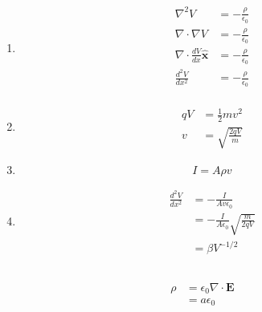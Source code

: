 \documentclass{article}
\renewcommand{\vec}[1]{\boldsymbol{\mathbf{#1}}}
\newcommand{\uvec}[1]{\hat{\vec{#1}}}
\begin{document}
\begin{enumerate}
  \item

        \begin{align*}
          \nabla^2 V                            & = -\frac{\rho}{\epsilon_0} \\
          \nabla \cdot \nabla V                 & = -\frac{\rho}{\epsilon_0} \\
          \nabla \cdot \frac{d V}{d x} \uvec{x} & = -\frac{\rho}{\epsilon_0} \\
          \frac{d^2 V}{d x^2}                   & = -\frac{\rho}{\epsilon_0} \\
        \end{align*}

  \item

        \begin{align*}
          q V & = \frac{1}{2} m v^2      \\
          v   & = \sqrt{\frac{2 q V}{m}}
        \end{align*}

  \item \[I = A \rho v\]

  \item

        \begin{align*}
          \frac{d^2 V}{d x^2} & = -\frac{I}{A v \epsilon_0}                      \\
                              & = -\frac{I}{A \epsilon_0} \sqrt{\frac{m}{2 q V}} \\
                              & = \beta V^{-1 / 2}
        \end{align*}
\end{enumerate}

\setcounter{subsection}{54}
\subsection{}

\begin{align*}
  \rho & = \epsilon_0 \nabla \cdot \vec{E} \\
       & = a \epsilon_0
\end{align*}

\subsection{}
\end{document}
